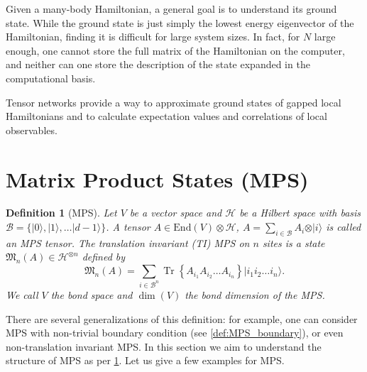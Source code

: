 \documentclass{article}
\newtheorem{definition}{Definition}
\newcommand{\tr}{\operatorname{Tr}}
\newcommand{\End}{\mathrm{End}}
\newcommand{\ket}[1]{\vert #1 \rangle}
\begin{document}
Given a many-body Hamiltonian, a general goal is to understand its ground state. While the ground state is just simply the lowest energy eigenvector of the Hamiltonian, finding it is difficult for large system sizes. In fact, for $N$ large enough, one cannot store the full matrix of the Hamiltonian on the computer, and neither can one store the description of the state expanded in the computational basis. 

Tensor networks provide a way to approximate ground states of gapped local Hamiltonians and to calculate expectation values and correlations of local observables. 
 
\section{Matrix Product States (MPS)}

\begin{definition}[MPS]\label{def:MPS_periodic}
  Let $V$ be a vector space and $\mathcal{H}$ be a Hilbert space with basis $\mathcal{B} = \{\ket{0},\ket{1},\dots \ket{d-1}\}$. A tensor $A\in \End(V)\otimes \mathcal{H}$, $A = \sum_{i\in \mathcal{B}} A_i \otimes \ket{i}$ is called an MPS tensor. The translation invariant (TI) MPS on $n$ sites is a state $\mathfrak{M}_n(A)\in \mathcal{H}^{\otimes n}$ defined by
  \begin{equation*}
  	\mathfrak{M}_n(A) = \sum_{i\in \mathcal{B}^n} \tr\left\{A_{i_1} A_{i_2} \dots A_{i_n}\right\} \ket{i_1 i_2 \dots i_n}.
  \end{equation*}
  We call $V$ the bond space and $\dim(V)$ the \emph{bond dimension} of the MPS.
\end{definition}

There are several generalizations of this definition: for example, one can consider MPS with non-trivial boundary condition (see \cref{def:MPS_boundary}), or even non-translation invariant MPS. In this section we aim to understand the structure of MPS as per \cref{def:MPS_periodic}. Let us give a few examples for MPS.
\end{document}
